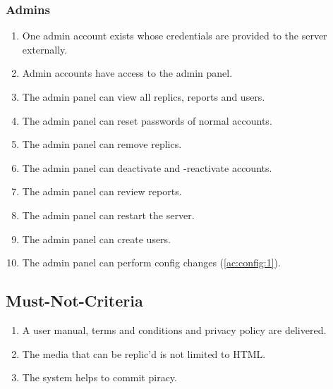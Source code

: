 \subsubsection{Admins}
\begin{enumerate}[label=\textit{AC \arabic*}, resume]
    \item \label{ac:admins:1} One admin account exists whose credentials are provided to the server externally.
    \item \label{ac:admins:2} Admin accounts have access to the admin panel.
    \item \label{ac:admins:3} The admin panel can view all replics, reports and users.
    \item \label{ac:admins:4} The admin panel can reset passwords of normal accounts.
    \item \label{ac:admins:5} The admin panel can remove replics.
    \item \label{ac:admins:6} The admin panel can deactivate and -reactivate accounts.
    \item \label{ac:admins:7} The admin panel can review reports.
    \item \label{ac:admins:8} The admin panel can restart the server.
    \item \label{ac:admins:9} The admin panel can create users.
    \item \label{ac:admins:10} The admin panel can perform config changes (\ref{ac:config:1}).
\end{enumerate}

\subsection{Must-Not-Criteria}\label{subsec:must-not-criteria}
\begin{enumerate}[label=\textit{MN \arabic*}]
    \item \label{mnc:1} A user manual, terms and conditions and privacy policy are delivered.
    \item \label{mnc:2} The media that can be replic'd is not limited to HTML\@.
    \item \label{mnc:3} The system helps to commit piracy.
\end{enumerate}